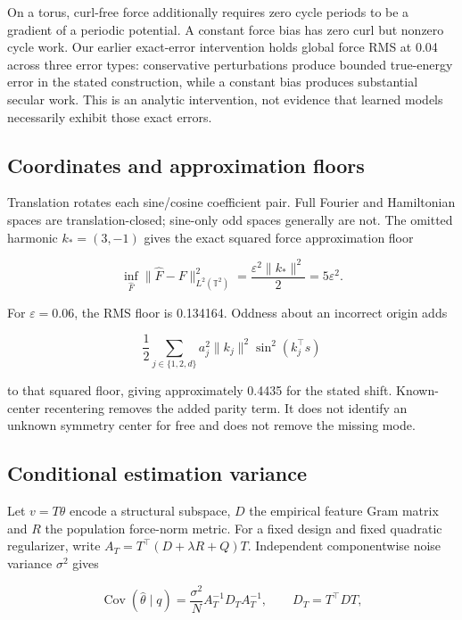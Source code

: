 \documentclass[
  10pt,
]{article}
\begin{document}
On a torus, curl-free force additionally requires zero cycle periods to
be a gradient of a periodic potential. A constant force bias has zero
curl but nonzero cycle work. Our earlier exact-error intervention holds
global force RMS at 0.04 across three error types: conservative
perturbations produce bounded true-energy error in the stated
construction, while a constant bias produces substantial secular work.
This is an analytic intervention, not evidence that learned models
necessarily exhibit those exact errors.

\hypertarget{coordinates-and-approximation-floors}{%
\subsection{Coordinates and approximation
floors}\label{coordinates-and-approximation-floors}}

Translation rotates each sine/cosine coefficient pair. Full Fourier and
Hamiltonian spaces are translation-closed; sine-only odd spaces
generally are not. The omitted harmonic \(k_*=(3,-1)\) gives the exact
squared force approximation floor

\[\inf_{\widehat F}\|\widehat F-F\|_{L^2(\mathbb T^2)}^2=\frac{\varepsilon^2\|k_*\|^2}{2}=5\varepsilon^2.\]

For \(\varepsilon=0.06\), the RMS floor is 0.134164. Oddness about an
incorrect origin adds

\[\frac12\sum_{j\in\{1,2,d\}}a_j^2\|k_j\|^2\sin^2(k_j^\top s)\]

to that squared floor, giving approximately 0.4435 for the stated shift.
Known-center recentering removes the added parity term. It does not
identify an unknown symmetry center for free and does not remove the
missing mode.

\hypertarget{conditional-estimation-variance}{%
\subsection{Conditional estimation
variance}\label{conditional-estimation-variance}}

Let \(v=T\theta\) encode a structural subspace, \(D\) the empirical
feature Gram matrix and \(R\) the population force-norm metric. For a
fixed design and fixed quadratic regularizer, write
\(A_T=T^\top(D+\lambda R+Q)T\). Independent componentwise noise variance
\(\sigma^2\) gives

\[\operatorname{Cov}(\widehat\theta\mid q)=\frac{\sigma^2}{N}A_T^{-1}D_TA_T^{-1},\qquad D_T=T^\top DT,\]
\end{document}
